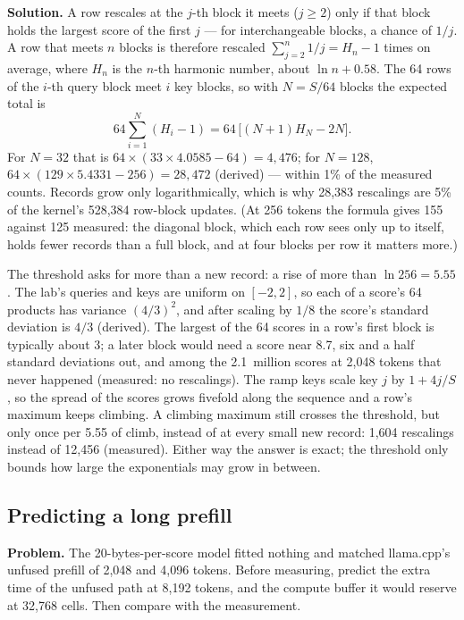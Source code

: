 \textbf{Solution.} A row rescales at the $j$-th block it meets ($j \ge 2$) only
if that block holds the largest score of the first $j$ --- for interchangeable
blocks, a chance of $1/j$. A row that meets $n$ blocks is therefore rescaled
$\sum_{j=2}^{n} 1/j = H_n - 1$ times on average, where $H_n$ is the $n$-th
harmonic number, about $\ln n + 0.58$. The 64 rows of the $i$-th query block
meet $i$ key blocks, so with $N = S/64$ blocks the expected total is
\[
64 \sum_{i=1}^{N} (H_i - 1) = 64\,\bigl[(N+1)H_N - 2N\bigr].
\]
For $N = 32$ that is $64 \times (33 \times 4.0585 - 64) = 4{,}476$; for $N = 128$,
$64 \times (129 \times 5.4331 - 256) = 28{,}472$ (derived) --- within 1\% of the
measured counts. Records grow only logarithmically, which is why 28,383
rescalings are 5\% of the kernel's 528,384 row-block updates. (At 256 tokens the
formula gives 155 against 125 measured: the diagonal block, which each row sees
only up to itself, holds fewer records than a full block, and at four blocks per
row it matters more.)

The threshold asks for more than a new record: a rise of more than
$\ln 256 = 5.55$. The lab's queries and keys are uniform on $[-2, 2]$, so each of
a score's 64 products has variance $(4/3)^2$, and after scaling by $1/8$ the
score's standard deviation is $4/3$ (derived). The largest of the 64 scores in a
row's first block is typically about 3; a later block would need a score near
8.7, six and a half standard deviations out, and among the 2.1~million scores
at 2,048 tokens that never happened (measured: no rescalings). The ramp keys scale key $j$ by $1 + 4j/S$, so
the spread of the scores grows fivefold along the sequence and a row's maximum
keeps climbing. A climbing maximum still crosses the threshold, but only once
per 5.55 of climb, instead of at every small new record: 1,604 rescalings
instead of 12,456 (measured). Either way the answer is exact; the threshold only
bounds how large the exponentials may grow in between.

\subsection{Predicting a long prefill}
\textbf{Problem.} The 20-bytes-per-score model fitted nothing and matched
llama.cpp's unfused prefill of 2,048 and 4,096 tokens. Before measuring,
predict the extra time of the unfused path at 8,192 tokens, and the compute
buffer it would reserve at 32,768 cells. Then compare with the measurement.

